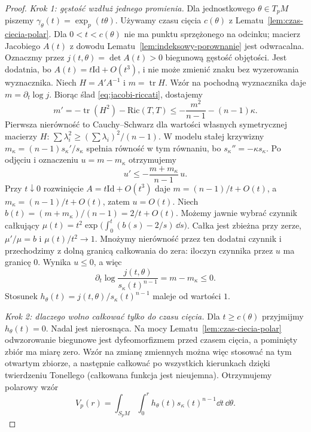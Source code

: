 \begin{proof}
\emph{Krok 1: gęstość wzdłuż jednego promienia.}
Dla jednostkowego $\theta\in T_pM$ piszemy
$\gamma_\theta(t)=\exp_p(t\theta)$.
Używamy czasu cięcia $c(\theta)$ z
Lematu~\ref{lem:czas-ciecia-polar}. Dla $0<t<c(\theta)$ nie ma punktu
sprzężonego na odcinku; macierz Jacobiego
$A(t)$ z dowodu Lematu~\ref{lem:indeksowy-porownanie}
jest odwracalna. Oznaczmy przez
$j(t,\theta)=\det A(t)>0$ biegunową gęstość
objętości. Jest dodatnia, bo
$A(t)=t\mathrm{Id}+O(t^3)$, i nie może zmienić
znaku bez wyzerowania wyznacznika.
Niech $H=A'A^{-1}$ i $m=\operatorname{tr}H$.
Wzór na pochodną wyznacznika daje
$m=\partial_t\log j$. Biorąc ślad
\eqref{eq:jacobi-riccati}, dostajemy
\[
 m'=-\operatorname{tr}(H^2)-\mathrm{Ric}(T,T)
 \leq-\frac{m^2}{n-1}-(n-1)\kappa.
\]
Pierwsza nierówność to Cauchy--Schwarz
dla wartości własnych symetrycznej macierzy $H$:
$\sum\lambda_i^2\geq(\sum\lambda_i)^2/(n-1)$.
W modelu stałej krzywizny
$m_\kappa=(n-1)s_\kappa'/s_\kappa$
spełnia równość w tym równaniu, bo
$s_\kappa''=-\kappa s_\kappa$.
Po odjęciu i oznaczeniu $u=m-m_\kappa$
otrzymujemy
\begin{equation}\label{eq:bg-riccati-roznica}
 u'\leq-\frac{m+m_\kappa}{n-1}\,u.
\end{equation}
Przy $t\downarrow0$ rozwinięcie
$A=t\mathrm{Id}+O(t^3)$ daje
$m=(n-1)/t+O(t)$, a
$m_\kappa=(n-1)/t+O(t)$, zatem $u=O(t)$.
Niech $b(t)=(m+m_\kappa)/(n-1)=2/t+O(t)$.
Możemy jawnie wybrać czynnik całkujący
$\mu(t)=t^2\exp\bigl(\int_0^t(b(s)-2/s)\,\dd s\bigr)$.
Całka jest zbieżna przy zerze, $\mu'/\mu=b$
i $\mu(t)/t^2\to1$.
Mnożymy nierówność przez ten dodatni czynnik
i przechodzimy z dolną granicą całkowania
do zera: iloczyn czynnika przez $u$
ma granicę $0$. Wynika $u\leq0$, a więc
\[
 \partial_t\log\frac{j(t,\theta)}
               {s_\kappa(t)^{n-1}}
 =m-m_\kappa\leq0.
\]
Stosunek $h_\theta(t)=j(t,\theta)/
s_\kappa(t)^{n-1}$ maleje od wartości $1$.

\emph{Krok 2: dlaczego wolno całkować tylko do
czasu cięcia.} Dla $t\geq c(\theta)$
przyjmijmy $h_\theta(t)=0$. Nadal jest
nierosnąca. Na mocy Lematu~\ref{lem:czas-ciecia-polar} odwzorowanie
biegunowe jest dyfeomorfizmem przed czasem cięcia,
a pominięty zbiór ma miarę zero. Wzór na zmianę
zmiennych można więc stosować na tym otwartym zbiorze,
a następnie całkować po wszystkich kierunkach dzięki
twierdzeniu Tonellego (całkowana funkcja jest nieujemna).
Otrzymujemy polarowy wzór
\begin{equation}\label{eq:bg-polar-objetosc}
 V_p(r)=\int_{S_pM}\int_0^r
      h_\theta(t)s_\kappa(t)^{n-1}
                  \dd t\,\dd\theta.
\end{equation}


\end{proof}
